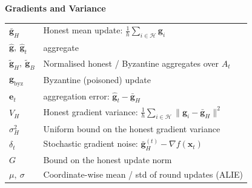 \vspace{1em}
\noindent\textbf{Gradients and Variance}
\begin{tabular}{ll}
$\bar{\mathbf{g}}_H$ & Honest mean update: $\tfrac{1}{h}\sum_{i\in\mathcal{H}}\mathbf{g}_i$ \\
$\hat{\mathbf{g}},\ \hat{\mathbf{g}}_t$ & \aegis{} aggregate \\
$\widetilde{\mathbf{g}}_H,\ \widetilde{\mathbf{g}}_B$ & Normalised honest / Byzantine aggregates over $A_t$ \\
$\mathbf{g}_{\mathrm{byz}}$ & Byzantine (poisoned) update \\
$\mathbf{e}_t$ & \aegis{} aggregation error: $\hat{\mathbf{g}}_t-\bar{\mathbf{g}}_H$ \\
$V_H$ & Honest gradient variance: $\tfrac{1}{h}\sum_{i\in\mathcal{H}}\|\mathbf{g}_i-\bar{\mathbf{g}}_H\|^2$ \\
$\sigma_H^2$ & Uniform bound on the honest gradient variance \\
$\delta_t$ & Stochastic gradient noise: $\bar{\mathbf{g}}_H^{(t)} - \nabla f(\mathbf{x}_t)$ \\
$G$ & Bound on the honest update norm \\
$\mu,\ \sigma$ & Coordinate-wise mean / std of round updates (ALIE) \\
\end{tabular}

